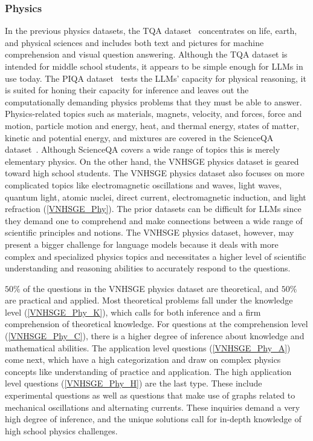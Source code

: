 \documentclass{article}
\begin{document}
{	
	\subsubsection{Physics}
	
	In the previous physics datasets, the TQA dataset~\cite{kembhavi2017you} concentrates on life, earth, and physical sciences and includes both text and pictures for machine comprehension and visual question answering. Although the TQA dataset is intended for middle school students, it appears to be simple enough for LLMs in use today. The PIQA dataset~\cite{bisk2020piqa} tests the LLMs' capacity for physical reasoning, it is suited for honing their capacity for inference and leaves out the computationally demanding physics problems that they must be able to answer. Physics-related topics such as materials, magnets, velocity, and forces, force and motion, particle motion and energy, heat, and thermal energy, states of matter, kinetic and potential energy, and mixtures are covered in the ScienceQA dataset~\cite{lu2022learn}. Although ScienceQA covers a wide range of topics this is merely elementary physics. On the other hand, the VNHSGE physics dataset is geared toward high school students. The VNHSGE physics dataset also focuses on more complicated topics like electromagnetic oscillations and waves, light waves, quantum light, atomic nuclei, direct current, electromagnetic induction, and light refraction (\ref{VNHSGE_Phy}). The prior datasets can be difficult for LLMs since they demand one to comprehend and make connections between a wide range of scientific principles and notions. The VNHSGE physics dataset, however, may present a bigger challenge for language models because it deals with more complex and specialized physics topics and necessitates a higher level of scientific understanding and reasoning abilities to accurately respond to the questions.
	
	$50\%$ of the questions in the VNHSGE physics dataset are theoretical, and $50\%$ are practical and applied. Most theoretical problems fall under the knowledge level (\ref{VNHSGE_Phy_K}), which calls for both inference and a firm comprehension of theoretical knowledge. For questions at the comprehension level (\ref{VNHSGE_Phy_C}), there is a higher degree of inference about knowledge and mathematical abilities. The application level questions (\ref{VNHSGE_Phy_A}) come next, which have a high categorization and draw on complex physics concepts like understanding of practice and application. The high application level questions (\ref{VNHSGE_Phy_H}) are the last type. These include experimental questions as well as questions that make use of graphs related to mechanical oscillations and alternating currents. These inquiries demand a very high degree of inference, and the unique solutions call for in-depth knowledge of high school physics challenges.
	
}
\end{document}
